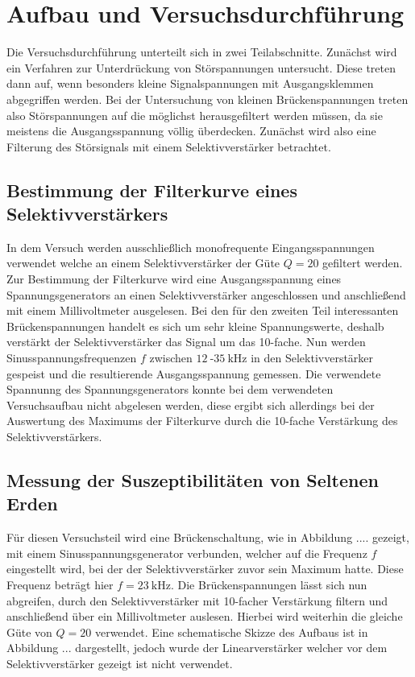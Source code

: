\section{Aufbau und Versuchsdurchführung}

Die Versuchsdurchführung unterteilt sich in zwei Teilabschnitte. Zunächst wird ein Verfahren zur Unterdrückung von Störspannungen untersucht. Diese treten dann auf, wenn besonders kleine Signalspannungen mit Ausgangsklemmen abgegriffen werden.
Bei der Untersuchung von kleinen Brückenspannungen treten also Störspannungen auf die möglichst herausgefiltert werden müssen, da sie meistens die Ausgangsspannung völlig überdecken. Zunächst wird also eine Filterung des Störsignals mit
einem Selektivverstärker betrachtet.

\subsection{Bestimmung der Filterkurve eines Selektivverstärkers}
In dem Versuch werden ausschließlich monofrequente Eingangsspannungen verwendet welche an einem Selektivverstärker der Güte $Q = 20$ gefiltert werden. Zur Bestimmung der Filterkurve wird eine Ausgangsspannung eines Spannungsgenerators 
an einen Selektivverstärker angeschlossen und anschließend mit einem Millivoltmeter ausgelesen. 
Bei den für den zweiten Teil interessanten Brückenspannungen handelt es sich um sehr kleine Spannungswerte, deshalb verstärkt der Selektivverstärker das Signal um das 10-fache.
Nun werden Sinusspannungsfrequenzen $f$ zwischen $\SI{12}{}$-$\SI{35}{\kilo\hertz}$ in den Selektivverstärker gespeist und die resultierende Ausgangsspannung gemessen.
Die verwendete Spannunng des Spannungsgenerators konnte bei dem verwendeten Versuchsaufbau nicht abgelesen werden, diese ergibt sich allerdings bei der Auswertung des Maximums der Filterkurve durch die 10-fache Verstärkung des Selektivverstärkers.

\subsection{Messung der Suszeptibilitäten von Seltenen Erden}
Für diesen Versuchsteil wird eine Brückenschaltung, wie in Abbildung .... gezeigt, mit einem Sinusspannungsgenerator verbunden, welcher auf die Frequenz $f$ eingestellt wird, bei der der Selektivverstärker zuvor sein Maximum hatte. Diese Frequenz beträgt hier $f = \SI{23}{\kilo\hertz}$.
Die Brückenspannungen lässt sich nun abgreifen, durch den Selektivverstärker mit 10-facher Verstärkung filtern und anschließend über ein Millivoltmeter auslesen. Hierbei wird weiterhin die gleiche Güte von $Q = 20$ verwendet.
Eine schematische Skizze des Aufbaus ist in Abbildung ... dargestellt, jedoch wurde der Linearverstärker welcher vor dem Selektivverstärker gezeigt ist nicht verwendet.

